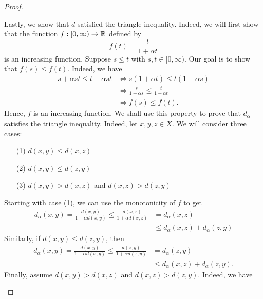 \documentclass[a4paper]{article}
\begin{document}
\begin{proof}
\begin{enumerate}
        Lastly, we show that \( d  \) satisfied the triangle inequality. Indeed, we will first show that the function \( f: [0,\infty) \to \mathbb{R}  \) defined by 
        \[  f(t) = \frac{ t  }{  1 + \alpha t  }  \] 
        is an increasing function. Suppose \( s \leq t  \) with \( s,t \in [0,\infty) \). Our goal is to show that \( f(s) \leq f(t) \). Indeed, we have 
        \begin{align*}
            s + \alpha s t \leq t + \alpha s t  &\iff s(1 + \alpha t ) \leq t (1 + \alpha s)  \\
                                                &\iff \frac{ s  }{ 1 + \alpha s  }  \leq \frac{ t  }{ 1 + \alpha t  }  \\
                                                &\iff f(s) \leq f(t).
        \end{align*}
        Hence, \( f \) is an increasing function. We shall use this property to prove that \( {d}_{\alpha}  \) satisfies the triangle inequality. Indeed, let \( x,y,z \in X  \). We will consider three cases:
        \begin{enumerate}
            \item[(1)] \( d(x,y) \leq d(x,z) \)
            \item[(2)] \( d(x,y)  \leq d(z,y)\)
            \item[(3)] \( d(x,y) > d(x,z)  \) and \( d(x,z) > d(z,y) \)
        \end{enumerate}
        Starting with case (1), we can use the monotonicity of \( f  \) to get 
        \begin{align*}
            {d}_{\alpha}(x,y) = \frac{ d(x,y) }{  1 + \alpha d(x,y) }  \leq \frac{ d(x,z)  }{  1 + \alpha d(x,z) } &= d_{\alpha}(x,z)     \\
                                                                                                                   &\leq d_{\alpha}(x,z) + d_{\alpha}(z,y)
        \end{align*}
        Similarly, if \( d(x,y) \leq d(z,y) \), then 
        \begin{align*}
            {d}_{\alpha}(x,y) = \frac{ d(x,y)  }{  1 + \alpha d(x,y) }  \leq \frac{ d(z,y)  }{  1 + \alpha d(z,y) }  &= {d}_{\alpha}(z,y)  \\
                                                                                                                     &\leq {d}_{\alpha}(x,z) + {d}_{\alpha}(z,y). 
        \end{align*}
        Finally, assume \( d(x,y) > d(x,z)  \) and \( d(x,z) > d(z,y) \). Indeed, we have 

\end{enumerate}
\end{proof}
\end{document}
